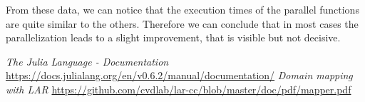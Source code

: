 \documentclass{article}
\begin{document}
From these data, we can notice that the execution times of the parallel functions are quite similar to the others.
Therefore we can conclude that in most cases the parallelization leads to a slight improvement, that is visible but not decisive.

\begin{thebibliography}{9} 
\emph{The Julia Language - Documentation} 
\url{https://docs.julialang.org/en/v0.6.2/manual/documentation/} 
\emph{Domain mapping with LAR}
\url{https://github.com/cvdlab/lar-cc/blob/master/doc/pdf/mapper.pdf} 
\end{thebibliography} 
\end{document}
